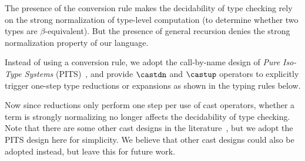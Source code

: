 \noindent The presence of the conversion rule makes the decidability of
type checking rely on the strong normalization of type-level computation
(to determine whether two types are $\beta$-equivalent).
But the presence of general recursion denies the strong normalization property
of our language.

Instead of using a conversion rule, we adopt the call-by-name design of
\emph{Pure Iso-Type Systems} (PITS)~\cite{isotype,yang2019pure},
and provide $\castdn$ and $\castup$ operators to explicitly trigger one-step
type reductions or expansions as shown in the typing rules below.

\noindent Now since reductions only perform one step per use of cast
operators, whether a term is strongly normalizing no longer affects the
decidability of type checking.
Note that there are some other cast designs in the
literature~\cite{guru,sjoberg:msfp12, kimmel:plpv, zombie:popl15}, but
we adopt the PITS design here for simplicity. We believe that other cast
designs could also be adopted instead, but leave this for future work.
